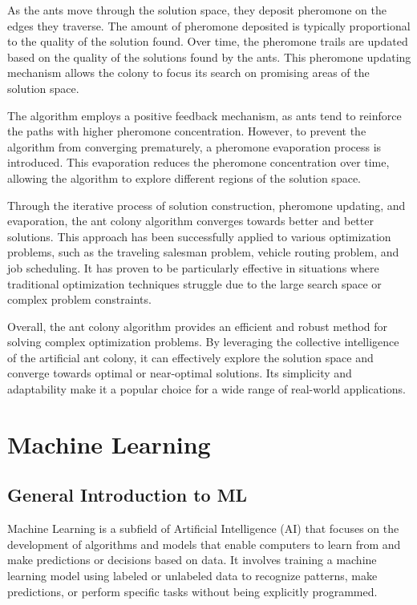 As the ants move through the solution space, they deposit pheromone on the edges they traverse. The amount of pheromone deposited is typically proportional to the quality of the solution found. Over time, the pheromone trails are updated based on the quality of the solutions found by the ants. This pheromone updating mechanism allows the colony to focus its search on promising areas of the solution space.

The algorithm employs a positive feedback mechanism, as ants tend to reinforce the paths with higher pheromone concentration. However, to prevent the algorithm from converging prematurely, a pheromone evaporation process is introduced. This evaporation reduces the pheromone concentration over time, allowing the algorithm to explore different regions of the solution space.

Through the iterative process of solution construction, pheromone updating, and evaporation, the ant colony algorithm converges towards better and better solutions. This approach has been successfully applied to various optimization problems, such as the traveling salesman problem, vehicle routing problem, and job scheduling. It has proven to be particularly effective in situations where traditional optimization techniques struggle due to the large search space or complex problem constraints.

Overall, the ant colony algorithm provides an efficient and robust method for solving complex optimization problems. By leveraging the collective intelligence of the artificial ant colony, it can effectively explore the solution space and converge towards optimal or near-optimal solutions. Its simplicity and adaptability make it a popular choice for a wide range of real-world applications.

\section{Machine Learning}%
\subsection{General Introduction to ML}
Machine Learning is a subfield of Artificial Intelligence (AI) that focuses on the development of algorithms and models that enable computers to learn from and make predictions or decisions based on data. It involves training a machine learning model using labeled or unlabeled data to recognize patterns, make predictions, or perform specific tasks without being explicitly programmed.

